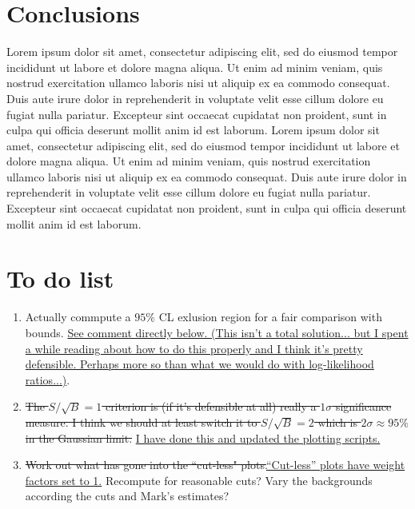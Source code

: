 \documentclass[11pt, a4paper]{article}
\newcommand{\lorem}{ \textcolor[rgb]{0.8,0.8,0.8}{Lorem ipsum dolor sit amet, consectetur
adipiscing elit, sed do eiusmod tempor incididunt ut labore et dolore magna
aliqua. Ut enim ad minim veniam, quis nostrud exercitation ullamco laboris nisi
ut aliquip ex ea commodo consequat. Duis aute irure dolor in reprehenderit in
voluptate velit esse cillum dolore eu fugiat nulla pariatur. Excepteur sint
occaecat cupidatat non proident, sunt in culpa qui officia deserunt mollit anim
id est laborum.}}
\newcommand{\newtext}[2]{\textcolor{#1}{\ul{#2}}}
\begin{document}
\section{Conclusions}
\lorem\lorem


\newpage 

\section{To do list}

\begin{enumerate}





\item Actually commpute a $95\%$ CL exlusion region for a fair comparison with
bounds. \newtext{PB}{See comment directly below. (This isn't a total
solution... but I spent a while reading about how to do this properly and I
think it's pretty defensible. Perhaps more so than what we would do with
log-likelihood ratios...)}.

\item \sout{The $S/\sqrt{B} =1$ criterion is (if it's defensible at all) really a
$1\sigma$ significance measure. I think we should at least switch it to
$S/\sqrt{B} =2$ which is $2\sigma\approx 95\%$ in the Gaussian limit.}
\newtext{PB}{I have done this and updated the plotting scripts.}

\item \sout{Work out what has gone into the ``cut-less"
plots.}\newtext{PB}{``Cut-less'' plots have weight factors set to 1.} Recompute
for reasonable cuts? Vary the backgrounds according the cuts and Mark's
estimates?



\end{enumerate}
\end{document}
